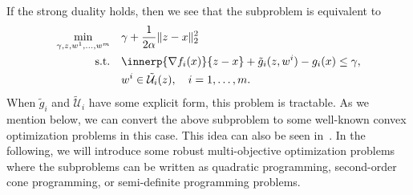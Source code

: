 \documentclass[../../main]{subfiles}
\begin{document}
If the strong duality holds, then we see that the subproblem  is equivalent to
\begin{equation} \label{eq:subproblem}
    \begin{aligned}
        \min_{\gamma, z, w^1, \dots, w^m} \quad   &\gamma + \frac{1}{2 \alpha} \norm{z - x}_2^2   \\ 
        \st    \quad   &\innerp{\nabla f_i(x)}{z - x} + \tilde{g}_i (z, w^i) - g_i(x) \leq \gamma,\\
                       &w^i \in \tilde{\mathcal{U}}_i (z), \quad i = 1,\ldots,m .
    \end{aligned}
\end{equation}
When $\tilde{g}_i$ and $\tilde{\mathcal{U}}_i$ have some explicit form, this problem is tractable.
As we mention below, we can convert the above subproblem to some well-known convex optimization problems in this case.
This idea can also be seen in~\cite{Ben-tal1998}.
In the following, we will introduce some robust multi-objective optimization problems where the subproblems can be written as quadratic programming, second-order cone programming, or semi-definite programming problems.






\end{document}
